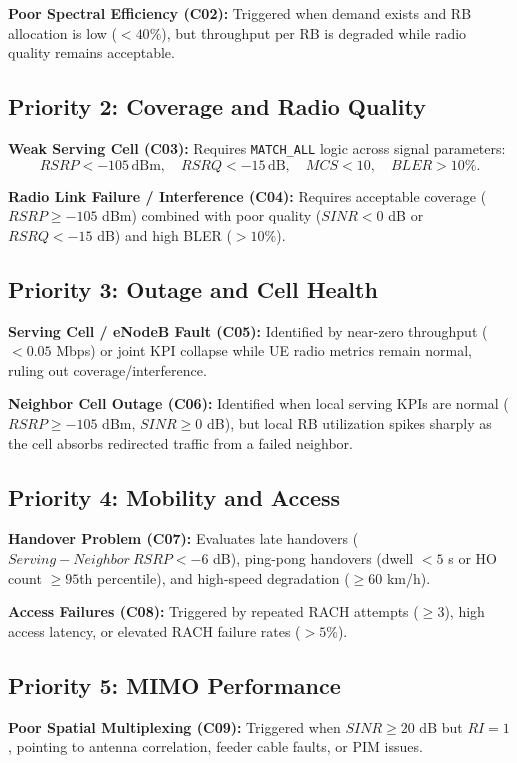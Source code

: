 \textbf{Poor Spectral Efficiency (C02):} Triggered when demand exists and RB allocation is low ($<40\%$), but throughput per RB is degraded while radio quality remains acceptable.

\subsection{Priority 2: Coverage and Radio Quality}

\textbf{Weak Serving Cell (C03):} Requires \texttt{MATCH\_ALL} logic across signal parameters:
\[
RSRP<-105\,\mathrm{dBm},\quad RSRQ<-15\,\mathrm{dB},\quad MCS<10,\quad BLER>10\%.
\]

\textbf{Radio Link Failure / Interference (C04):} Requires acceptable coverage ($RSRP\ge-105$ dBm) combined with poor quality ($SINR<0$ dB or $RSRQ<-15$ dB) and high BLER ($>10\%$).

\subsection{Priority 3: Outage and Cell Health}

\textbf{Serving Cell / eNodeB Fault (C05):} Identified by near-zero throughput ($<0.05$ Mbps) or joint KPI collapse while UE radio metrics remain normal, ruling out coverage/interference.

\textbf{Neighbor Cell Outage (C06):} Identified when local serving KPIs are normal ($RSRP\ge-105$ dBm, $SINR\ge0$ dB), but local RB utilization spikes sharply as the cell absorbs redirected traffic from a failed neighbor.

\subsection{Priority 4: Mobility and Access}

\textbf{Handover Problem (C07):} Evaluates late handovers ($Serving-Neighbor~RSRP<-6$ dB), ping-pong handovers (dwell $<5$ s or HO count $\ge95$th percentile), and high-speed degradation ($\ge60$ km/h).

\textbf{Access Failures (C08):} Triggered by repeated RACH attempts ($\ge3$), high access latency, or elevated RACH failure rates ($>5\%$).

\subsection{Priority 5: MIMO Performance}

\textbf{Poor Spatial Multiplexing (C09):} Triggered when $SINR\ge20$ dB but $RI=1$, pointing to antenna correlation, feeder cable faults, or PIM issues.

